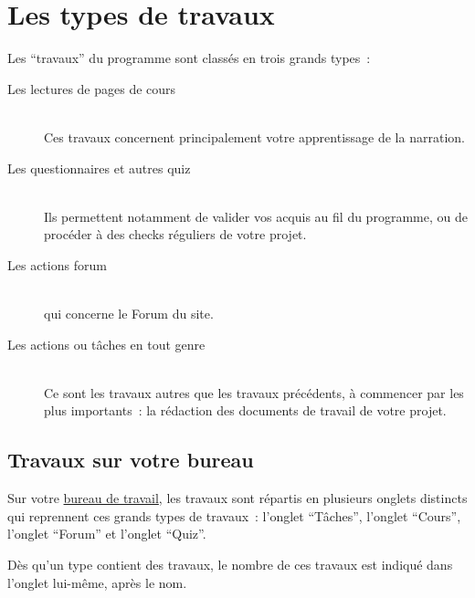 % 
% 
% 
% 
% 
% 
% 
% 

\section{Les types de travaux}\hypertarget{type-travaux}{}\label{type-travaux}

Les “travaux” du programme \unan{} sont classés en trois grands types~{}:

\begin{description}
\item[Les lectures de pages de cours] \hfill \\
 Ces travaux concernent principalement votre apprentissage de la narration.



\item[Les questionnaires et autres quiz] \hfill \\
 Ils permettent notamment de valider vos acquis au fil du programme, ou de procéder à des checks réguliers de votre projet.



\item[Les actions forum] \hfill \\
 qui concerne le Forum du site.



\item[Les actions ou tâches en tout genre] \hfill \\
 Ce sont les travaux autres que les travaux précédents, à commencer par les plus importants~{}: la rédaction des documents de travail de votre projet.
\end{description}

\subsection{Travaux sur votre bureau}\hypertarget{travaux-sur-votre-bureau}{}\label{travaux-sur-votre-bureau}

Sur votre \hyperlink{bureau}{bureau de travail}, les travaux sont répartis en plusieurs onglets distincts qui reprennent ces grands types de travaux~{}: l'onglet ``Tâches'', l'onglet ``Cours'', l'onglet ``Forum'' et l'onglet ``Quiz''.

Dès qu'un type contient des travaux, le nombre de ces travaux est indiqué dans l'onglet lui-même, après le nom.

